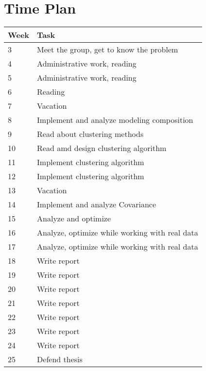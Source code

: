 \documentclass{article}
\begin{document}
\section*{Time Plan}
\begin{tabularx}{\linewidth}{| l | X |}
\hline
Week & Task\\
\hline
3 & Meet the group, get to know the problem \\

4 & Administrative work, reading \\

5 & Administrative work, reading \\

6 & Reading \\

7 & Vacation \\

8 & Implement and analyze modeling composition \\

9 & Read about clustering methods \\

10 & Read amd design clustering algorithm\\

11 & Implement clustering algorithm \\

12 & Implement clustering algorithm \\

13 & Vacation \\

14 & Implement and analyze Covariance \\

15 & Analyze and optimize\\

16 & Analyze, optimize while working with real data  \\	

17 & Analyze, optimize while working with real data \\

18 & Write report \\

19 & Write report  \\

20 & Write report \\

21 & Write report \\

22 & Write report \\

23 & Write report \\

24 & Write report \\

25 & Defend thesis  \\
\hline
\end{tabularx}



\end{document}
